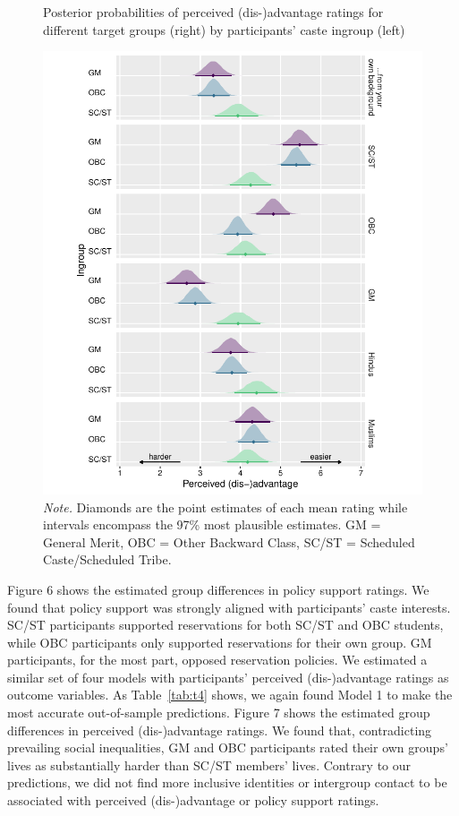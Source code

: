 \documentclass[12pt, a4paper]{article}
\begin{document}
\begin{figure}
\caption{Posterior probabilities of perceived (dis-)advantage ratings for different target groups (right) by participants’ caste ingroup (left)}
\centering
\includegraphics[scale=1]{../figures/figure-7}
\caption*{\textit{Note.} Diamonds are the point estimates of each mean rating while intervals encompass the 97\% most plausible estimates. GM = General Merit, OBC = Other Backward Class, SC/ST = Scheduled Caste/Scheduled Tribe.}
\label{fig:f7}
\end{figure}


Figure 6 shows the estimated group differences in policy support ratings. We found that policy support was strongly aligned with participants’ caste interests. SC/ST participants supported reservations for both SC/ST and OBC students, while OBC participants only supported reservations for their own group. GM participants, for the most part, opposed reservation policies. We estimated a similar set of four models with participants’ perceived (dis-)advantage ratings as outcome variables. As Table~\ref{tab:t4} shows, we again found Model 1 to make the most accurate out-of-sample predictions. Figure  7 shows the estimated group differences in perceived (dis-)advantage ratings. We found that, contradicting prevailing social inequalities, GM and OBC participants rated their own groups’ lives as substantially harder than SC/ST members’ lives. Contrary to our predictions, we did not find more inclusive identities or intergroup contact to be associated with perceived (dis-)advantage or policy support ratings.
\end{document}
